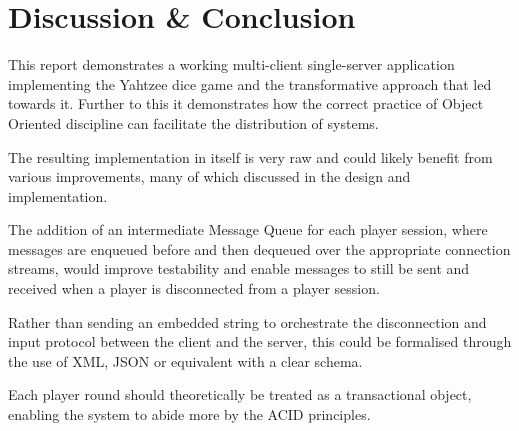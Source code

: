 \section{Discussion \& Conclusion}

This report demonstrates a working multi-client single-server application implementing the Yahtzee dice game and the transformative approach that led towards it. Further to this it demonstrates how the correct practice of Object Oriented discipline can facilitate the distribution of systems.

The resulting implementation in itself is very raw and could likely benefit from various improvements, many of which discussed in the design and implementation. 

The addition of an intermediate Message Queue for each player session, where messages are enqueued before and then dequeued over the appropriate connection streams, would improve testability and enable messages to still be sent and received when a player is disconnected from a player session.

Rather than sending an embedded string to orchestrate the disconnection and input protocol between the client and the server, this could be formalised through the use of XML, JSON or equivalent with a clear schema. 

Each player round should theoretically be treated as a transactional object, enabling the system to abide more by the ACID principles. 